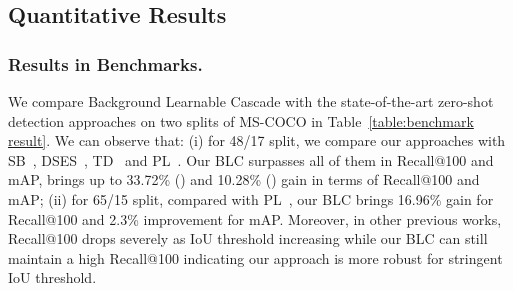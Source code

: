 \documentclass[runningheads]{llncs}
\begin{document}
\subsection{Quantitative Results}
\subsubsection{Results in Benchmarks.}
We compare Background Learnable Cascade with the state-of-the-art zero-shot detection approaches on two splits of MS-COCO in Table~\ref{table:benchmark result}. We can observe that: (i) for 48/17 split, we compare our approaches with SB~\cite{bansal2018zero}, DSES~\cite{bansal2018zero}, TD~\cite{li2019zero} and PL~\cite{rahman2020improved}. Our BLC surpasses all of them in Recall@100 and mAP, brings up to 33.72\% () and 10.28\% () gain in terms of Recall@100 and mAP; (ii) for 65/15 split, compared with PL~\cite{rahman2020improved}, our BLC brings 16.96\% gain for Recall@100 and 2.3\% improvement for mAP.
Moreover, in other previous works, Recall@100 drops severely as IoU threshold increasing while our BLC can still maintain a high Recall@100 indicating our approach is more robust for stringent IoU threshold.
\end{document}
